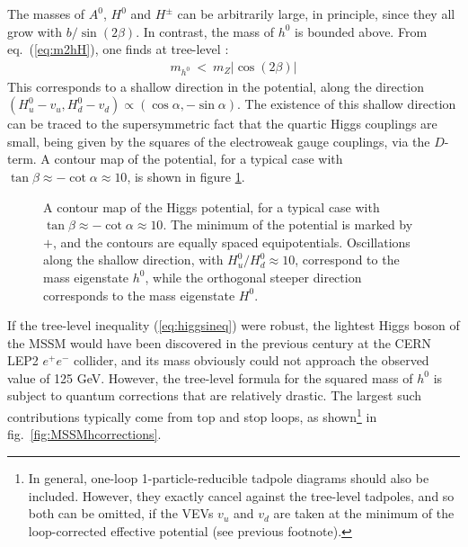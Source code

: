 \documentclass[11pt]{article}
\def\beq{\begin{eqnarray}}
\def\eeq{\end{eqnarray}}
\begin{document}
The masses of $A^0$, $H^0$ and $H^\pm$ can be arbitrarily
large, in principle, since they all grow with $b/\sin (2\beta)$. In contrast, the mass of
$h^0$ is bounded above. From eq.~(\ref{eq:m2hH}), one finds
at tree-level \cite{treelevelhiggsbound}:
\beq
m_{h^0} \><\> m_Z  |\cos (2\beta) | 
\label{eq:higgsineq}
\eeq
This corresponds to a shallow direction in the %
potential, along the 
direction $(H_u^0-v_u, H_d^0-v_d) \propto (\cos\alpha,-\sin\alpha)$. The 
existence of this shallow direction can be traced to the supersymmetric fact that the 
quartic Higgs couplings are small, being given by the squares of the electroweak gauge 
couplings, via the $D$-term. A contour map of the potential, for a typical 
case with $\tan\beta \approx -\cot\alpha \approx 10$, is shown in figure 
\ref{fig:contourmap}.%
\begin{figure}
\centerline{}
\vspace{-0.32cm}
\caption{A contour map of the Higgs potential, for a typical case with
$\tan\beta \approx -\cot\alpha \approx 10$. The minimum of the potential
is marked by $+$, and the contours are equally spaced equipotentials.
Oscillations along the shallow direction, with $H^0_u/H_d^0 \approx 10$,
correspond to the mass eigenstate $h^0$, while the orthogonal steeper
direction corresponds to the mass eigenstate $H^0$.\label{fig:contourmap}}
\end{figure}
%
If the tree-level inequality (\ref{eq:higgsineq}) were robust, the 
lightest Higgs boson of the MSSM would have been discovered in the previous century
at the CERN LEP2 $e^+e^-$ collider, and its mass obviously could not approach the 
observed value of 125 GeV.  
However, the tree-level formula for the squared mass of $h^0$ is subject 
to quantum corrections that are relatively drastic. The largest such 
contributions typically come from top and stop loops, as 
shown\footnote{In general, one-loop 1-particle-reducible 
tadpole diagrams should also be included.
However, they exactly cancel against the tree-level
tadpoles, and so both can be omitted,
if the VEVs $v_u$ and $v_d$ are taken at the minimum of the 
loop-corrected effective potential (see previous footnote).} 
in fig.~\ref{fig:MSSMhcorrections}.%
\end{document}
